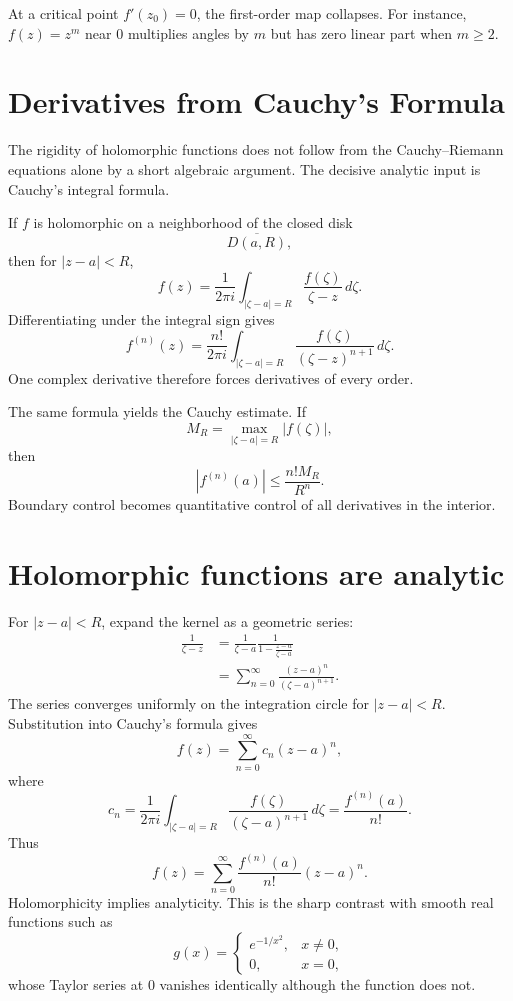 At a critical point \(f'(z_0)=0\), the first-order map collapses.  For instance, \(f(z)=z^m\) near \(0\) multiplies angles by \(m\) but has zero linear part when \(m\ge2\).

\section{Derivatives from Cauchy's Formula}

The rigidity of holomorphic functions does not follow from the Cauchy--Riemann equations alone by a short algebraic argument.  The decisive analytic input is Cauchy's integral formula.

If \(f\) is holomorphic on a neighborhood of the closed disk
\[
  \overline{D(a,R)},
\]
then for \(|z-a|<R\),
\[
  \boxed{
  f(z)=\frac{1}{2\pi i}
  \int_{|\zeta-a|=R}
  \frac{f(\zeta)}{\zeta-z}\,d\zeta.}
\]
Differentiating under the integral sign gives
\[
  f^{(n)}(z)
  =\frac{n!}{2\pi i}
  \int_{|\zeta-a|=R}
  \frac{f(\zeta)}{(\zeta-z)^{n+1}}\,d\zeta.
\]
One complex derivative therefore forces derivatives of every order.

The same formula yields the Cauchy estimate.  If
\[
  M_R=\max_{|\zeta-a|=R}|f(\zeta)|,
\]
then
\[
  |f^{(n)}(a)|
  \le \frac{n!M_R}{R^n}.
\]
Boundary control becomes quantitative control of all derivatives in the interior.

\section{Holomorphic functions are analytic}

For \(|z-a|<R\), expand the kernel as a geometric series:
\[
\begin{aligned}
  \frac{1}{\zeta-z}
  &=\frac{1}{\zeta-a}
  \frac{1}{1-\frac{z-a}{\zeta-a}}\\
  &=\sum_{n=0}^{\infty}
  \frac{(z-a)^n}{(\zeta-a)^{n+1}}.
\end{aligned}
\]
The series converges uniformly on the integration circle for \(|z-a|<R\).  Substitution into Cauchy's formula gives
\[
  f(z)=\sum_{n=0}^{\infty}c_n(z-a)^n,
\]
where
\[
  c_n=
  \frac{1}{2\pi i}
  \int_{|\zeta-a|=R}
  \frac{f(\zeta)}{(\zeta-a)^{n+1}}\,d\zeta
  =\frac{f^{(n)}(a)}{n!}.
\]
Thus
\[
  \boxed{
  f(z)=\sum_{n=0}^{\infty}
  \frac{f^{(n)}(a)}{n!}(z-a)^n.}
\]
Holomorphicity implies analyticity.  This is the sharp contrast with smooth real functions such as
\[
  g(x)=
  \begin{cases}
  e^{-1/x^2},&x\ne0,\\
  0,&x=0,
  \end{cases}
\]
whose Taylor series at \(0\) vanishes identically although the function does not.

